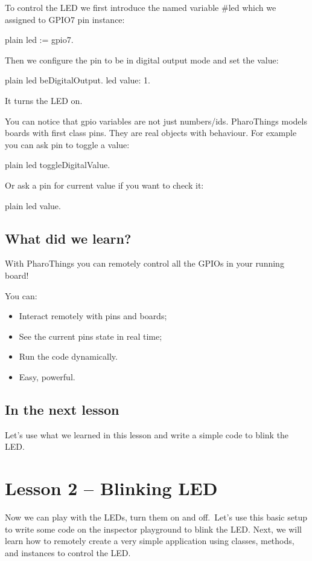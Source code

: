 \documentclass[10pt,twoside,english]{_support/latex/sbabook/sbabook}
\begin{document}
To control the LED we first introduce the named variable \#led which we assigned to GPIO7 pin instance:

\begin{displaycode}{plain}
led := gpio7.
\end{displaycode}

Then we configure the pin to be in digital output mode and set the value:

\begin{displaycode}{plain}
led beDigitalOutput.
led value: 1.
\end{displaycode}

It turns the LED on.

You can notice that gpio variables are not just numbers/ids. PharoThings models boards with first class pins. They are real objects with behaviour. For example you can ask pin to toggle a value:

\begin{displaycode}{plain}
led toggleDigitalValue.
\end{displaycode}

Or ask a pin for current value if you want to check it:

\begin{displaycode}{plain}
led value.
\end{displaycode}
\section{What did we learn?}
With PharoThings you can remotely control all the GPIOs in your running board!

You can:

\begin{itemize}
\item Interact remotely with pins and boards;
\item See the current pins state in real time;
\item Run the code dynamically.
\item Easy, powerful.
\end{itemize}
\section{In the next lesson}
Let’s use what we learned in this lesson and write a simple code to blink the LED.
\chapter{Lesson 2 – Blinking LED }
Now we can play with the LEDs, turn them on and off. Let's use this basic setup to write some code on the inspector playground to blink the LED. Next, we will learn how to remotely create a very simple application using classes, methods, and instances to control the LED.
\end{document}
